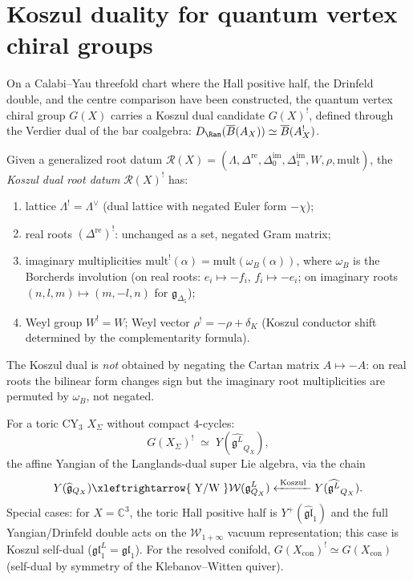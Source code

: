 \section{Koszul duality for quantum vertex chiral groups}
\label{sec:thy-qvcg-koszul}

On a Calabi--Yau threefold chart where the Hall positive half, the
Drinfeld double, and the centre comparison have been constructed, the
quantum vertex chiral group \(G(X)\) carries a Koszul dual candidate
\(G(X)^!\), defined through the Verdier dual of the bar coalgebra:
\(D_{\Ran}(\overline{B}(A_X))\simeq\overline{B}(A_X^!)\).

\begin{definition}
\label{def:thy-qvcg-koszul-root-datum}
Given a generalized root datum $\mathcal{R}(X)=(\Lambda,\Delta^{\mathrm{re}},
\Delta^{\mathrm{im}}_0,\Delta^{\mathrm{im}}_1,W,\rho,\mathrm{mult})$,
the \emph{Koszul dual root datum} $\mathcal{R}(X)^!$ has:
\begin{enumerate}[label=(\roman*)]
\item lattice $\Lambda^!=\Lambda^\vee$ (dual lattice with negated Euler form $-\chi$);
\item real roots $(\Delta^{\mathrm{re}})^!$: unchanged as a set, negated Gram matrix;
\item imaginary multiplicities $\mathrm{mult}^!(\alpha)=\mathrm{mult}(\omega_B(\alpha))$,
where $\omega_B$ is the Borcherds involution (on real roots: $e_i\mapsto-f_i$,
$f_i\mapsto-e_i$; on imaginary roots $(n,l,m)\mapsto(m,-l,n)$ for
$\mathfrak{g}_{\Delta_5}$);
\item Weyl group $W^!=W$; Weyl vector $\rho^!=-\rho+\delta_K$ (Koszul
conductor shift determined by the complementarity formula).
\end{enumerate}
The Koszul dual is \emph{not} obtained by negating the Cartan matrix $A\mapsto-A$:
on real roots the bilinear form changes sign but the imaginary root multiplicities
are permuted by $\omega_B$, not negated.
\end{definition}

\begin{conjecture}
\label{prop:thy-qvcg-toric-koszul}
\ClaimStatusConjectured
For a toric $\mathrm{CY}_3$ $X_\Sigma$ without compact $4$-cycles:
\[
G(X_\Sigma)^!\;\simeq\;Y(\widehat{\mathfrak{g}^L}_{Q_X}),
\]
the affine Yangian of the Langlands-dual super Lie algebra, via the chain
\[
Y(\widehat{\mathfrak{g}}_{Q_X})\xleftrightarrow{\;\text{Y/W}\;}\mathcal{W}(\mathfrak{g}^L_{Q_X})
\xleftarrow{\;\mathrm{Koszul}\;}Y(\widehat{\mathfrak{g}^L}_{Q_X}).
\]
Special cases: for $X=\mathbb{C}^3$, the toric Hall positive half is
$Y^+(\widehat{\mathfrak{gl}}_1)$ and the full Yangian/Drinfeld double acts
on the $\mathcal{W}_{1+\infty}$ vacuum representation; this case
is Koszul self-dual ($\mathfrak{gl}_1^L=\mathfrak{gl}_1$). For the resolved
conifold, $G(X_{\mathrm{con}})^!\simeq G(X_{\mathrm{con}})$ (self-dual by
symmetry of the Klebanov--Witten quiver).
\end{conjecture}

